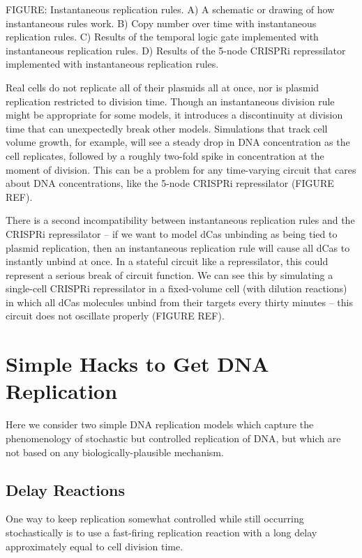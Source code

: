 \documentclass[preprint,12pt]{elsarticle}
\begin{document}
\vspace{.5in}
FIGURE: Instantaneous replication rules. A) A schematic or drawing of how instantaneous rules work. B) Copy number over time with instantaneous replication rules. C) Results of the temporal logic gate implemented with instantaneous replication rules. D) Results of the 5-node CRISPRi repressilator implemented with instantaneous replication rules. 
\vspace{.5in}

Real cells do not replicate all of their plasmids all at once, nor is plasmid replication restricted to division time. Though an instantaneous division rule might be appropriate for some models, it introduces a discontinuity at division time that can unexpectedly break other models. Simulations that track cell volume growth, for example, will see a steady drop in DNA concentration as the cell replicates, followed by a roughly two-fold spike in concentration at the moment of division. This can be a problem for any time-varying circuit that cares about DNA concentrations, like the 5-node CRISPRi repressilator (FIGURE REF).

There is a second incompatibility between instantaneous replication rules and the CRISPRi repressilator -- if we want to model dCas unbinding as being tied to plasmid replication, then an instantaneous replication rule will cause all dCas to instantly unbind at once. In a stateful circuit like a repressilator, this could represent a serious break of circuit function. We can see this by simulating a single-cell CRISPRi repressilator in a fixed-volume cell (with dilution reactions) in which all dCas molecules unbind from their targets every thirty minutes -- this circuit does not oscillate properly (FIGURE REF). 

\section{Simple Hacks to Get DNA Replication}\label{S:hackmodels}

Here we consider two simple DNA replication models which capture the phenomenology of stochastic but controlled replication of DNA, but which are not based on any biologically-plausible mechanism. 

\subsection{Delay Reactions}

One way to keep replication somewhat controlled while still occurring stochastically is to use a fast-firing replication reaction with a long delay approximately equal to cell division time. 
\end{document}
